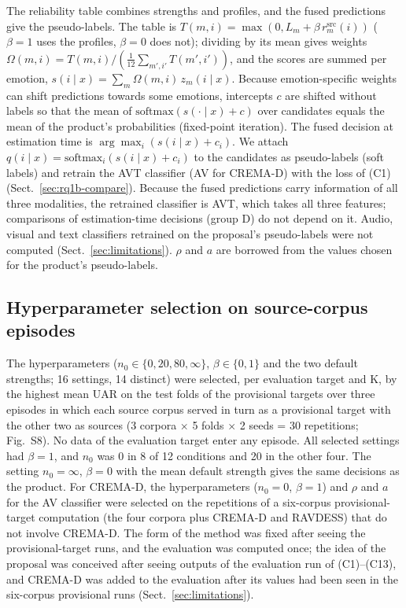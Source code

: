 The reliability table combines strengths and profiles, and the fused predictions give the pseudo-labels. The table is $T(m,i)=\max(0,L_m+\beta\,r^{\mathrm{src}}_m(i))$ ($\beta=1$ uses the profiles, $\beta=0$ does not); dividing by its mean gives weights $\Omega(m,i)=T(m,i)/(\frac{1}{12}\sum_{m',i'}T(m',i'))$, and the scores are summed per emotion, $s(i\mid x)=\sum_m \Omega(m,i)\,z_m(i\mid x)$. Because emotion-specific weights can shift predictions towards some emotions, intercepts $c$ are shifted without labels so that the mean of $\mathrm{softmax}(s(\cdot\mid x)+c)$ over candidates equals the mean of the product's probabilities (fixed-point iteration). The fused decision at estimation time is $\arg\max_i(s(i\mid x)+c_i)$. We attach $q(i\mid x)=\mathrm{softmax}_i(s(i\mid x)+c_i)$ to the candidates as pseudo-labels (soft labels) and retrain the AVT classifier (AV for CREMA-D) with the loss of (C1) (Sect.~\ref{sec:rq1b-compare}). Because the fused predictions carry information of all three modalities, the retrained classifier is AVT, which takes all three features; comparisons of estimation-time decisions (group D) do not depend on it. Audio, visual and text classifiers retrained on the proposal's pseudo-labels were not computed (Sect.~\ref{sec:limitations}). $\rho$ and $a$ are borrowed from the values chosen for the product's pseudo-labels.

\subsection{Hyperparameter selection on source-corpus episodes}\label{sec:hp}
The hyperparameters ($n_0\in\{0,20,80,\infty\}$, $\beta\in\{0,1\}$ and the two default strengths; 16 settings, 14 distinct) were selected, per evaluation target and K, by the highest mean UAR on the test folds of the provisional targets over three episodes in which each source corpus served in turn as a provisional target with the other two as sources (3 corpora $\times$ 5 folds $\times$ 2 seeds = 30 repetitions; Fig.~S8). No data of the evaluation target enter any episode. All selected settings had $\beta=1$, and $n_0$ was 0 in 8 of 12 conditions and 20 in the other four. The setting $n_0=\infty$, $\beta=0$ with the mean default strength gives the same decisions as the product. For CREMA-D, the hyperparameters ($n_0=0$, $\beta=1$) and $\rho$ and $a$ for the AV classifier were selected on the repetitions of a six-corpus provisional-target computation (the four corpora plus CREMA-D and RAVDESS) that do not involve CREMA-D. The form of the method was fixed after seeing the provisional-target runs, and the evaluation was computed once; the idea of the proposal was conceived after seeing outputs of the evaluation run of (C1)--(C13), and CREMA-D was added to the evaluation after its values had been seen in the six-corpus provisional runs (Sect.~\ref{sec:limitations}).
